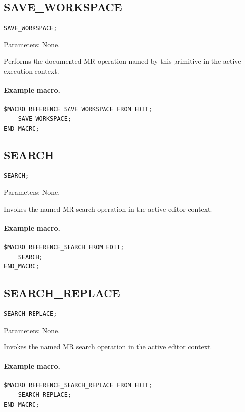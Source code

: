 \documentclass[a4paper,10pt,twoside,openany]{book}
\newenvironment{mrmacextension}{\begin{changebar}}{\end{changebar}}
\begin{document}
\begin{mrmacextension}
\label{prim:procedure-save-workspace}
\subsection*{SAVE\_WORKSPACE}
\begin{verbatim}
SAVE_WORKSPACE;
\end{verbatim}
Parameters: None.

Performs the documented MR operation named by this primitive in the active execution context.

\paragraph{Example macro.}
\begin{verbatim}
$MACRO REFERENCE_SAVE_WORKSPACE FROM EDIT;
    SAVE_WORKSPACE;
END_MACRO;
\end{verbatim}
\end{mrmacextension}

\begin{mrmacextension}
\label{prim:procedure-search}
\subsection*{SEARCH}
\begin{verbatim}
SEARCH;
\end{verbatim}
Parameters: None.

Invokes the named MR search operation in the active editor context.

\paragraph{Example macro.}
\begin{verbatim}
$MACRO REFERENCE_SEARCH FROM EDIT;
    SEARCH;
END_MACRO;
\end{verbatim}
\end{mrmacextension}

\begin{mrmacextension}
\label{prim:procedure-search-replace}
\subsection*{SEARCH\_REPLACE}
\begin{verbatim}
SEARCH_REPLACE;
\end{verbatim}
Parameters: None.

Invokes the named MR search operation in the active editor context.

\paragraph{Example macro.}
\begin{verbatim}
$MACRO REFERENCE_SEARCH_REPLACE FROM EDIT;
    SEARCH_REPLACE;
END_MACRO;
\end{verbatim}
\end{mrmacextension}
\end{document}
